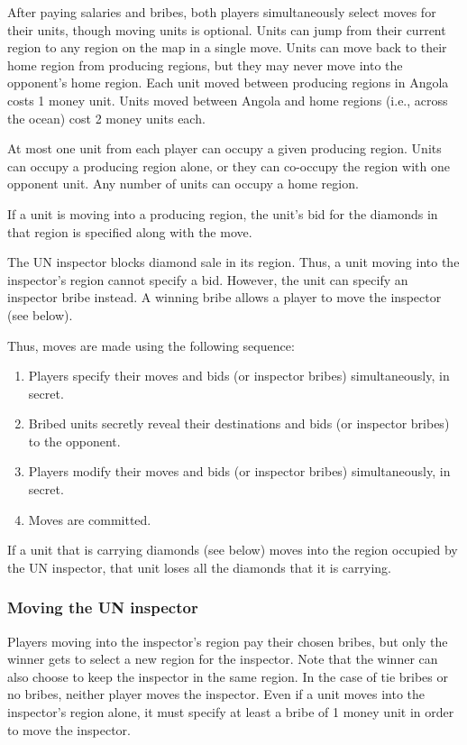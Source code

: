 \documentclass[8pt]{extarticle}
\begin{document}
After paying salaries and bribes, both players simultaneously select moves for their units, though moving units is optional.  Units can jump from their current region to any region on the map in a single move.  Units can move back to their home region from producing regions, but they may never move into the opponent's home region.  Each unit moved between producing regions in Angola costs 1 money unit.  Units moved between Angola and home regions (i.e., across the ocean) cost 2 money units each.

At most one unit from each player can occupy a given producing region.  Units can occupy a producing region alone, or they can co-occupy the region with one opponent unit.  Any number of units can occupy a home region.  

If a unit is moving into a producing region, the unit's bid for the diamonds in that region is specified along with the move.

The UN inspector blocks diamond sale in its region.  Thus, a unit moving into the inspector's region cannot specify a bid.  However, the unit can specify an inspector bribe instead.  A winning bribe allows a player to move the inspector (see below).

Thus, moves are made using the following sequence:
\begin{enumerate}
\item Players specify their moves and bids (or inspector bribes) simultaneously, in secret.
\item Bribed units secretly reveal their destinations and bids (or inspector bribes) to the opponent.
\item Players modify their moves and bids (or inspector bribes) simultaneously, in secret.
\item Moves are committed.
\end{enumerate}

If a unit that is carrying diamonds (see below) moves into the region occupied by the UN inspector, that unit loses all the diamonds that it is carrying.


\subsubsection{Moving the UN inspector}
Players moving into the inspector's region pay their chosen bribes, but only the winner gets to select a new region for the inspector.  Note that the winner can also choose to keep the inspector in the same region.  In the case of tie bribes or no bribes, neither player moves the inspector.  Even if a unit moves into the inspector's region alone, it must specify at least a bribe of 1 money unit in order to move the inspector.
\end{document}
